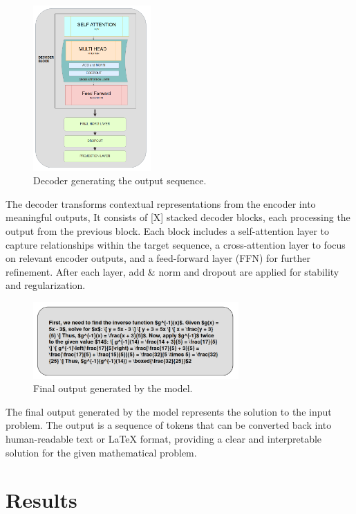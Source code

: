 \documentclass{article}
\begin{document}
\begin{figure}[htbp]
  \centering
  \includegraphics[width=0.4\textwidth]{./figures/decoder.png}
  \caption{Decoder generating the output sequence.}
  \label{fig:decoder}
\end{figure}

The decoder transforms contextual representations from the encoder into meaningful outputs, It consists of [X] stacked decoder blocks, each processing the output from the previous block. Each block includes a self-attention layer to capture relationships within the target sequence, a cross-attention layer to focus on relevant encoder outputs, and a feed-forward layer (FFN) for further refinement. After each layer, add \& norm and dropout are applied for stability and regularization.

\begin{figure}[htbp]
  \centering
  \includegraphics[width=0.7\textwidth]{./figures/output.png}
  \caption{Final output generated by the model.}
  \label{fig:output}
\end{figure}

The final output generated by the model represents the solution to the input problem. The output is a sequence of tokens that can be converted back into human-readable text or LaTeX format, providing a clear and interpretable solution for the given mathematical problem.


\section{Results}
\end{document}
